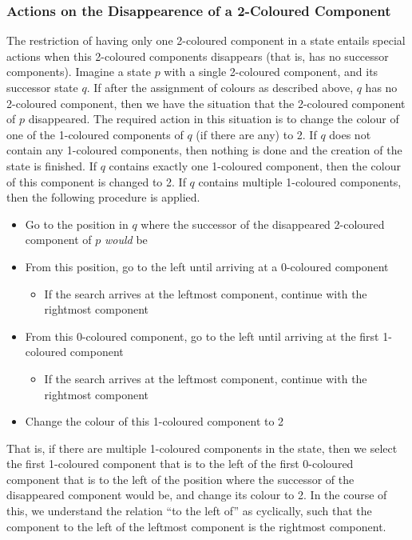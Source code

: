 \subsubsection{Actions on the Disappearence of a 2-Coloured Component}
The restriction of having only one 2-coloured component in a state entails special actions when this 2-coloured components disappears (that is, has no successor components). Imagine a state $p$ with a single 2-coloured component, and its successor state $q$. If after the assignment of colours as described above, $q$ has no 2-coloured component, then we have the situation that the 2-coloured component of $p$ disappeared. The required action in this situation is to change the colour of one of the 1-coloured components of $q$ (if there are any) to 2. If $q$ does not contain any 1-coloured components, then nothing is done and the creation of the state is finished. If $q$ contains exactly one 1-coloured component, then the colour of this component is changed to 2. If $q$ contains multiple 1-coloured components, then the following procedure is applied.

\begin{itemize}
\item Go to the position in $q$ where the successor of the disappeared 2-coloured component of $p$ \textit{would} be
\item From this position, go to the left until arriving at a 0-coloured component
  \begin{itemize}
  \item If the search arrives at the leftmost component, continue with the rightmost component
  \end{itemize}
\item From this 0-coloured component, go to the left until arriving at the first 1-coloured component
  \begin{itemize}
  \item If the search arrives at the leftmost component, continue with the rightmost component
  \end{itemize}
\item Change the colour of this 1-coloured component to 2
\end{itemize}

That is, if there are multiple 1-coloured components in the state, then we select the first 1-coloured component that is to the left of the first 0-coloured component that is to the left of the position where the successor of the disappeared component would be, and change its colour to 2. In the course of this, we understand the relation ``to the left of'' as cyclically, such that the component to the left of the leftmost component is the rightmost component.


